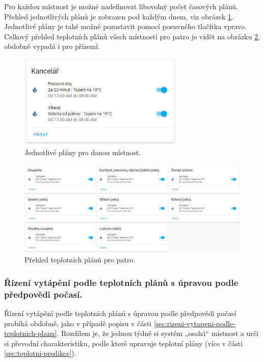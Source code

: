 Pro každou místnost je možné nadefinovat libovolný počet časových plánů. Přehled jednotlivých plánů je zobrazen pod každým dnem, viz obrázek \ref{fig:teplotni-plany-ha}. Jednotlivé plány je také možné pozastavit pomocí posuvného tlačítka vpravo. Celkový přehled teplotních plánů všech místností pro patro je vidět na obrázku \ref{fig:teplotni-plany-prehled-ha}, obdobně vypadá i pro přízemí.

\begin{figure}[H]
    \centering
    \includegraphics[width=0.7\textwidth]{images/software-ha/teplotni-plany-ha.png}
    \caption{Jednotlivé plány pro danou místnost.}
    \label{fig:teplotni-plany-ha}
\end{figure}


\begin{figure}[H]
    \centering
    \includegraphics[width=\textwidth]{images/software-ha/teplotni-plany-prehled-ha.png}
    \caption{Přehled teplotních plánů pro patro.}
    \label{fig:teplotni-plany-prehled-ha}
\end{figure}

\subsubsection{Řízení vytápění podle teplotních plánů s úpravou podle předpovědi počasí.} 
\label{sec:rizeni-vytapeni-podle-teplotnich-planu-s-upravou-podle-predpovedi-pocasi}
Řízení vytápění podle teplotních plánů s úpravou podle předpovědi počasí probíhá obdobně, jako v případě popisu v části \ref{sec:rizeni-vytapeni-podle-teplotnich-planu}. Rozdílem je, že jednou týdně si systém „osahá“ místnost a určí si převodní charakteristiku, podle které  upravuje teplotní plány (více v části \ref{sec:teplotni-predikce}).

